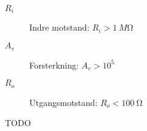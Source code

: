\begin{description}
\item [$R_i$] Indre motstand: $R_i > \SI{1}{M\ohm}$
\item [$A_v$] Forsterkning: $A_v > 10^5$
\item [$R_o$] Utgangsmotstand: $R_o < \SI{100}{\ohm}$
\end{description}



TODO
